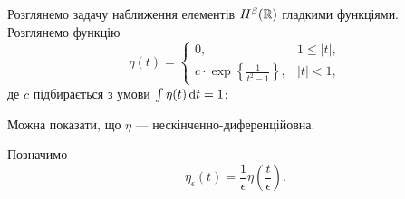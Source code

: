 Розглянемо задачу наближення елементів $H^\beta(\mathbb{R})$ гладкими функціями. Розглянемо функцію
\begin{equation}
    \eta(t) = \begin{cases}
        0, & 1 \le |t|, \\
        c \cdot \exp\left\{\frac{1}{t^2 - 1}\right\}, & |t| < 1,
    \end{cases}
\end{equation}
де $c$ підбирається з умови $\int \eta(t) \mathop{}\!\mathrm{d} t = 1$:

\begin{remark}
    Можна показати, що $\eta$ --- нескінченно-диференційовна.
\end{remark}

Позначимо
\begin{equation}
    \eta_\epsilon(t) = \frac{1}{\epsilon} \eta \left( \frac{t}{\epsilon} \right).
\end{equation}
